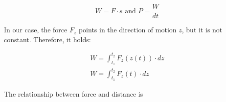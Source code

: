 \begin{equation}
    W = F \cdot s \text{   and   } P = \frac{W}{dt}
\end{equation}

\noindent In our case, the force \(F_z\) points in the direction of motion \(z\), but it is not constant. Therefore, it holds:

\begin{equation}
    \begin{aligned}
        W = \int_{t_1}^{t_2} F_z (z(t))\cdot dz\\
        W = \int_{t_1}^{t_2} F_z (t)\cdot dz
    \end{aligned}
\end{equation}

The relationship between force and distance is
